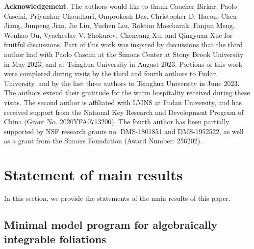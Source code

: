 \documentclass[11pt]{amsart}
\numberwithin{equation}{section}
\newcommand{\bb}{\bm{b}}
\newcommand{\Qq}{\mathbb{Q}}
\theoremstyle{definition}
\theoremstyle{definition}
\theoremstyle{definition}
\begin{document}
\begin{comment}
\smallskip

\noindent\textbf{Part \ref{part:gmm}}. Good minimal model, applications, and proofs of the main theorems: Sections \ref{sec: gmm fdlt} and \ref{sec: proof of the main theorems}. In Section \ref{sec: gmm fdlt}, we prove the existence of good minimal models for $\Qq$-factorial F-dlt generalized foliated quadruples polarized with an ample divisor. Similar arguments imply the base-point-freeness theorem for such quadruples, leading to a special case of the Prokhorov-Shokurov $\bb$-semi-ampleness conjecture. Lastly, in Section \ref{sec: proof of the main theorems}, we prove all the main theorems of the paper that are not covered in the previous sections.
\end{comment}

\medskip


\noindent\textbf{Acknowledgement}. The authors would like to thank Caucher Birkar, Paolo Cascini, Priyankur Chaudhuri, Omprokash Das, Christopher D. Hacon, Chen Jiang, Junpeng Jiao, Jie Liu, Yuchen Liu, Roktim Mascharak, Fanjun Meng, Wenhao Ou, Vyacheslav V. Shokurov, Chenyang Xu, and Qingyuan Xue for fruitful discussions. Part of this work was inspired by discussions that the third author had with Paolo Cascini at the Simons Center at Stony Brook University in May 2023, and at Tsinghua University in August 2023. Portions of this work were completed during visits by the third and fourth authors to Fudan University, and by the last three authors to Tsinghua University in June 2023. The authors extend their gratitude for the warm hospitality received during these visits. The second author is affiliated with LMNS at Fudan University, and has received support from the National Key Research and Development Program of China (Grant No. 2020YFA0713200). The fourth author has been partially supported by NSF research grants no. DMS-1801851 and DMS-1952522, as well as a grant from the Simons Foundation (Award Number: 256202).






\section{Statement of main results}\label{sec: statement of main results}

In this section, we provide the statements of the main results of this paper.

\subsection{Minimal model program for algebraically integrable foliations}\label{subsec: mmp aif} 
\end{document}
